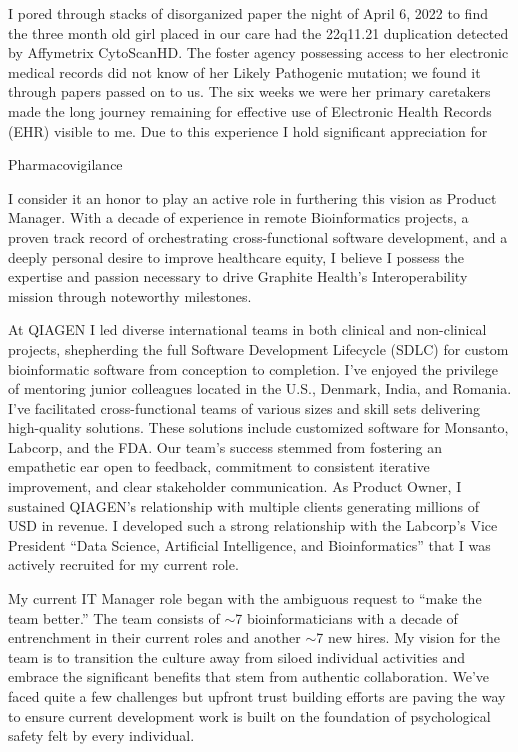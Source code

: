 \documentclass[10pt,letterpaper]{article}
\begin{document}
\begin{flushleft}

	I pored through stacks of disorganized paper the night of April 6, 2022 to find the three month old girl placed in our care had the 22q11.21 duplication detected by Affymetrix CytoScanHD. The foster agency possessing access to her electronic medical records did not know of her Likely Pathogenic mutation; we found it through papers passed on to us. The six weeks we were her primary caretakers made the long journey remaining for effective use of Electronic Health Records (EHR) visible to me. Due to this experience I hold significant appreciation for
	
	Pharmacovigilance


	I consider it an honor to play an active role in furthering this vision as Product Manager. With a decade of experience in remote Bioinformatics projects, a proven track record of orchestrating cross-functional software development, and a deeply personal desire to improve healthcare equity, I believe I possess the expertise and passion necessary to drive Graphite Health\rq{}s Interoperability mission through noteworthy milestones.
	
	At QIAGEN I led diverse international teams in both clinical and non-clinical projects, shepherding the full Software Development Lifecycle (SDLC) for custom bioinformatic software from conception to completion. I\rq{}ve enjoyed the privilege of mentoring junior colleagues located in the U.S., Denmark, India, and Romania. I\rq{}ve facilitated cross-functional teams of various sizes and skill sets delivering high-quality solutions. These solutions include customized software for Monsanto, Labcorp, and the FDA. Our team\rq{}s success stemmed from fostering an empathetic ear open to feedback, commitment to consistent iterative improvement, and clear stakeholder communication. As Product Owner, I sustained QIAGEN's relationship with multiple clients generating millions of USD in revenue. I developed such a strong relationship with the Labcorp\rq{}s Vice President  “Data Science, Artificial Intelligence, and Bioinformatics” that I was actively recruited for my current role. 
	 
	My current IT Manager role began with the ambiguous request to “make the team better.” The team consists of \(\sim \)7 bioinformaticians with a decade of entrenchment in their current roles and another \(\sim \)7 new hires. My vision for the team is to transition the culture away from siloed individual activities and embrace the significant benefits that stem from authentic collaboration. We\rq{}ve faced quite a few challenges but upfront trust building efforts are paving the way to ensure current development work is built on the foundation of psychological safety felt by every individual.  
	

\end{flushleft}
\end{document}
